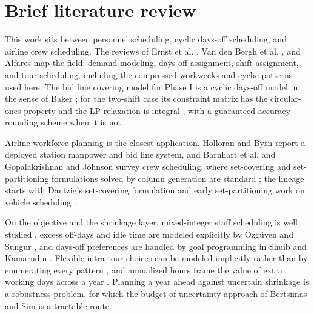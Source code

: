 \documentclass[preprint,12pt]{elsarticle}
\begin{document}
\section{Brief literature review}\label{sec:lit}
   This work sits between personnel scheduling, cyclic days-off scheduling, and airline crew scheduling. The reviews of Ernst et al. \citep{ernst2004staff}, Van den Bergh et al. \citep{vandenbergh2013personnel}, and Alfares \citep{alfares2004survey} map the field: demand modeling, days-off assignment, shift assignment, and tour scheduling, including the compressed workweeks and cyclic patterns used here. The bid line covering model for Phase I is a cyclic days-off model in the sense of Baker \citep{baker1974scheduling}; for the two-shift case its constraint matrix has the circular-ones property and the LP relaxation is integral \citep{bartholdi1980cyclic}, with a guaranteed-accuracy rounding scheme when it is not \citep{bartholdi1981roundoff}.

   Airline workforce planning is the closest application. Holloran and Byrn \citep{holloran1986united} report a deployed station manpower and bid line system, and Barnhart et al. \citep{barnhart2003applications} and Gopalakrishnan and Johnson \citep{gopalakrishnan2005airline} survey crew scheduling, where set-covering and set-partitioning formulations solved by column generation are standard \citep{dantzig1960decomposition,vance1997airline,desaulniers2005column,irnich2005shortest}; the lineage starts with Dantzig's set-covering formulation \citep{dantzig1954comment} and early set-partitioning work on vehicle scheduling \citep{foster1976integer}.

   On the objective and the shrinkage layer, mixed-integer staff scheduling is well studied \citep{beaumont1997scheduling}, excess off-days and idle time are modeled explicitly by \"Ozg\"uven and Sungur \citep{ozguven2013integer}, and days-off preferences are handled by goal programming in Shuib and Kamarudin \citep{shuib2018solving}. Flexible intra-tour choices can be modeled implicitly rather than by enumerating every pattern \citep{bechtold1990implicit}, and annualized hours frame the value of extra working days across a year \citep{corominas2005annualised}. Planning a year ahead against uncertain shrinkage is a robustness problem, for which the budget-of-uncertainty approach of Bertsimas and Sim \citep{bertsimas2004price} is a tractable route.

\end{document}
